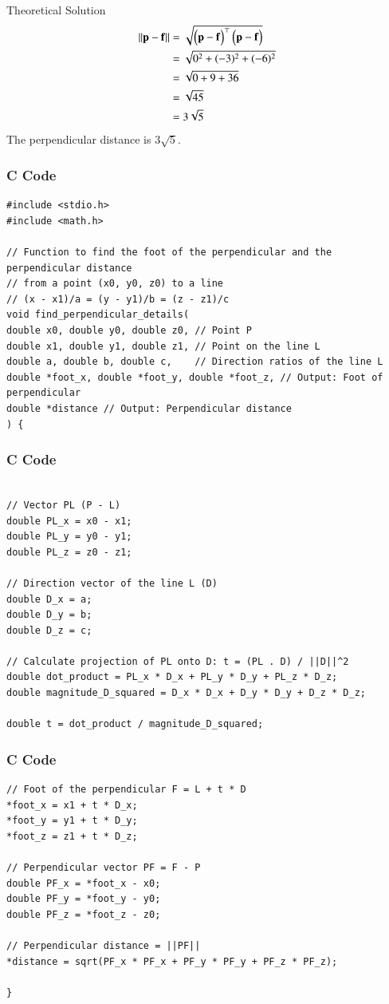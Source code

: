 \documentclass{beamer}
\begin{document}
\begin{frame}{Theoretical Solution}
\begin{align}
\left\lVert\mathbf{p}-\mathbf{f}\right\rVert &= \sqrt{\begin{pmatrix}\mathbf{p}-\mathbf{f}\end{pmatrix}^\top \begin{pmatrix}\mathbf{p}-\mathbf{f}\end{pmatrix}} \\
&= \sqrt{0^2 + (-3)^2 + (-6)^2} \\
&= \sqrt{0 + 9 + 36} \\
&= \sqrt{45} \\
&= 3\sqrt{5}
\end{align}
The perpendicular distance is $3\sqrt{5}$.
\end{frame}

\begin{frame}[fragile]
\frametitle{C Code}
\begin{lstlisting}
#include <stdio.h>
#include <math.h>

// Function to find the foot of the perpendicular and the perpendicular distance
// from a point (x0, y0, z0) to a line
// (x - x1)/a = (y - y1)/b = (z - z1)/c
void find_perpendicular_details(
double x0, double y0, double z0, // Point P
double x1, double y1, double z1, // Point on the line L
double a, double b, double c,    // Direction ratios of the line L
double *foot_x, double *foot_y, double *foot_z, // Output: Foot of perpendicular
double *distance // Output: Perpendicular distance
) {
\end{lstlisting}
\end{frame}

\begin{frame}[fragile]
\frametitle{C Code}
\begin{lstlisting}

// Vector PL (P - L)
double PL_x = x0 - x1;
double PL_y = y0 - y1;
double PL_z = z0 - z1;

// Direction vector of the line L (D)
double D_x = a;
double D_y = b;
double D_z = c;

// Calculate projection of PL onto D: t = (PL . D) / ||D||^2
double dot_product = PL_x * D_x + PL_y * D_y + PL_z * D_z;
double magnitude_D_squared = D_x * D_x + D_y * D_y + D_z * D_z;

double t = dot_product / magnitude_D_squared;
\end{lstlisting}
\end{frame}

\begin{frame}[fragile]
\frametitle{C Code}
\begin{lstlisting}
// Foot of the perpendicular F = L + t * D
*foot_x = x1 + t * D_x;
*foot_y = y1 + t * D_y;
*foot_z = z1 + t * D_z;

// Perpendicular vector PF = F - P
double PF_x = *foot_x - x0;
double PF_y = *foot_y - y0;
double PF_z = *foot_z - z0;

// Perpendicular distance = ||PF||
*distance = sqrt(PF_x * PF_x + PF_y * PF_y + PF_z * PF_z);

}
\end{lstlisting}
\end{frame}
\end{document}
